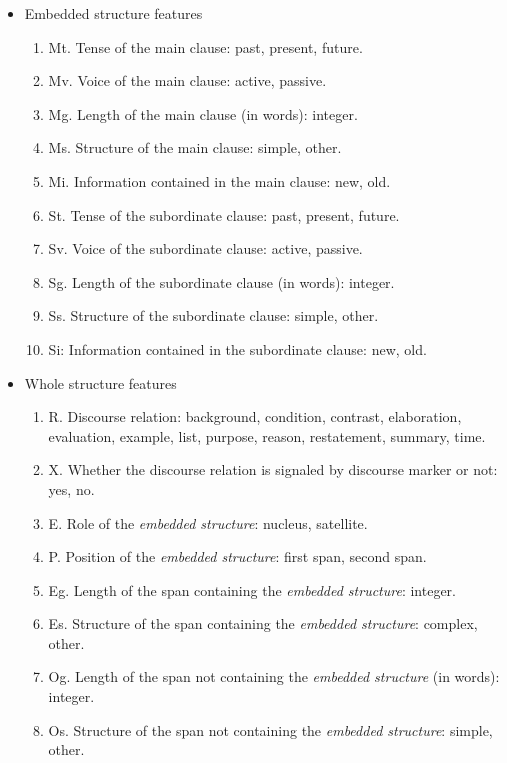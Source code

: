 \documentclass[english]{jnlp_1.3e}
\begin{document}
\begin{itemize}
 \item Embedded structure features
   \begin{enumerate}
    \item Mt. Tense of the main clause: past, present, future.  
    \item Mv. Voice of the main clause: active, passive.
    \item Mg. Length of the main clause (in words): integer.
    \item Ms. Structure of the main clause: simple, other.  
    \item Mi. Information contained in the main clause: new, old.
    \item St. Tense of the subordinate clause: past, present, future.
    \item Sv. Voice of the subordinate clause: active, passive.
    \item Sg. Length of the subordinate clause (in words): integer.
    \item Ss. Structure of the subordinate clause: simple, other.
    \item Si: Information contained in the subordinate clause: new, old.
\end{enumerate}
\end{itemize}

\begin{itemize}
 \item Whole structure features
   \begin{enumerate}
   \item R. Discourse relation: background, condition, contrast, elaboration, evaluation, example, list, purpose, reason, restatement, summary, time.
   \item X. Whether the discourse relation is signaled by discourse marker or not: yes, no.
   \item E. Role of the \textit{embedded structure}: nucleus, satellite.
   \item P. Position of the \textit{embedded structure}: first span, second span.
   \item Eg. Length of the span containing the \textit{embedded structure}: integer.
   \item Es. Structure of the span containing the \textit{embedded structure}: complex, other. 
   \item Og. Length of the span not containing the \textit{embedded structure} (in words): integer.
   \item Os. Structure of the span not containing the \textit{embedded structure}: simple, other.
  \end{enumerate}
\end{itemize}
\end{document}
